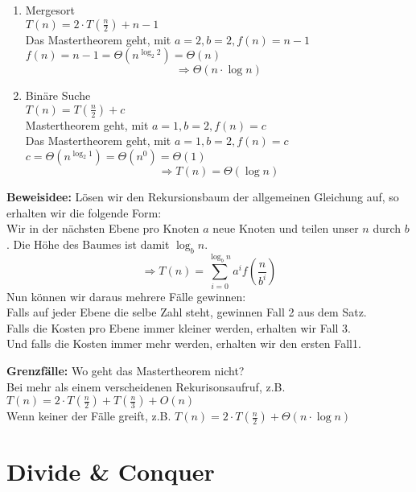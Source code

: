 \begin{description}
\begin{enumerate}[\bfseries (1)]
\item Mergesort\\
$T(n) = 2 \cdot T( \frac{n}{2} ) + n - 1$\\
Das Mastertheorem geht, mit $a = 2, b=2, f(n) = n - 1$\\
$f(n) = n - 1 = \Theta ( n^{\log_2 2}) = \Theta (n)$
$$
\Rightarrow \Theta (n \cdot \log n)
$$

\item Binäre Suche\\
$T(n) = T(\frac{n}{2}) + c$\\
Mastertheorem geht, mit $a = 1, b = 2, f(n) = c$\\
Das Mastertheorem geht, mit $a = 1, b=2, f(n) = c$\\
$c = \Theta ( n^{\log_2 1} ) = \Theta (n^0) = \Theta (1)$
$$
\Rightarrow T(n) = \Theta (\log n)
$$

\end{enumerate}

\item{\bfseries Beweisidee:} Lösen wir den Rekursionsbaum der allgemeinen Gleichung auf, so erhalten wir die folgende Form:\\
Wir in der nächsten Ebene pro Knoten $a$ neue Knoten und teilen unser $n$ durch $b$. Die Höhe des Baumes ist damit $\log_b n$.
$$
\Rightarrow T(n) = \sum_{i = 0}^{\log_b n} a^i f\left( \frac{n}{b^i} \right)
$$
Nun können wir daraus mehrere Fälle gewinnen:\\
Falls auf jeder Ebene die selbe Zahl steht, gewinnen Fall 2 aus dem Satz.\\
Falls die Kosten pro Ebene immer kleiner werden, erhalten wir Fall 3.\\
Und falls die Kosten immer mehr werden, erhalten wir den ersten Fall1.\\

\item{\bfseries Grenzfälle:} Wo geht das Mastertheorem nicht?\\
Bei mehr als einem verscheidenen Rekurisonsaufruf, z.B. $T(n) = 2 \cdot T(\frac{n}{2}) + T(\frac{n}{3}) + O(n)$\\

Wenn keiner der Fälle greift, z.B. $T(n) = 2 \cdot T(\frac{n}{2}) + \Theta ( n \cdot \log n)$

\end{description}

\section{Divide \& Conquer}

